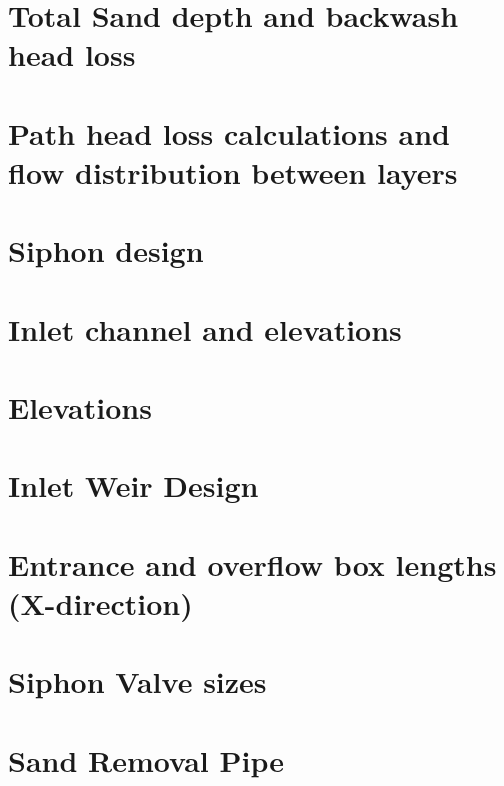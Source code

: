 \documentclass[letterpaper,10pt,english]{sphinxmanual}
\begin{document}
\section{Total Sand depth and backwash head loss}
\label{\detokenize{Filtration/Filtration_Design:total-sand-depth-and-backwash-head-loss}}

\section{Path head loss calculations and flow distribution between layers}
\label{\detokenize{Filtration/Filtration_Design:path-head-loss-calculations-and-flow-distribution-between-layers}}

\section{Siphon design}
\label{\detokenize{Filtration/Filtration_Design:siphon-design}}

\section{Inlet channel and elevations}
\label{\detokenize{Filtration/Filtration_Design:inlet-channel-and-elevations}}

\section{Elevations}
\label{\detokenize{Filtration/Filtration_Design:elevations}}

\section{Inlet Weir Design}
\label{\detokenize{Filtration/Filtration_Design:inlet-weir-design}}

\section{Entrance and overflow box lengths (X-direction)}
\label{\detokenize{Filtration/Filtration_Design:entrance-and-overflow-box-lengths-x-direction}}

\section{Siphon Valve sizes}
\label{\detokenize{Filtration/Filtration_Design:siphon-valve-sizes}}

\section{Sand Removal Pipe}
\label{\detokenize{Filtration/Filtration_Design:sand-removal-pipe}}
\end{document}
